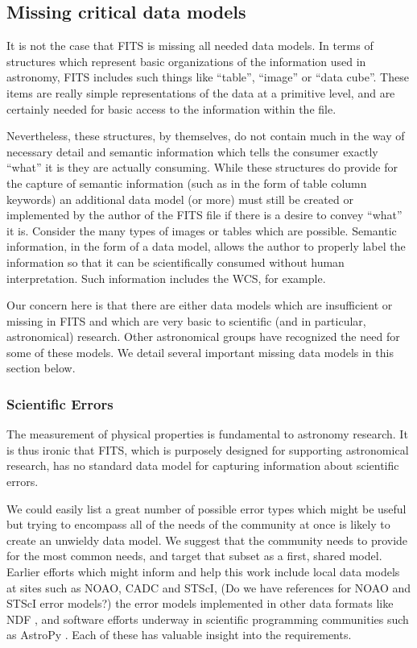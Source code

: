 \documentclass[final,authoryear,5p,times,twocolumn]{elsarticle}
\begin{document}
{{\subsection{Missing critical data models}
\label{section_crit_data_models}


It is not the case that FITS is missing all needed data models. In
terms of structures which represent basic organizations of the
information used in astronomy, FITS includes such things like ``table'',
``image'' or ``data cube''. These items are really simple representations
of the data at a primitive level, and are certainly needed for basic
access to the information within the file.


Nevertheless, these structures, by themselves, do not contain much in
the way of necessary detail and semantic information which tells the
consumer exactly ``what'' it is they are actually consuming. While these
structures do provide for the capture of semantic information (such as
in the form of table column keywords) an additional data model (or
more) must still be created or implemented by the author of the FITS
file if there is a desire to convey ``what'' it is. Consider the many
types of images or tables which are possible. Semantic information, in
the form of a data model, allows the author to properly label the
information so that it can be scientifically consumed without human
interpretation. Such information includes the WCS, for example.


Our concern here is that there are either data models which are
insufficient or missing in FITS and which are very basic to scientific
(and in particular, astronomical) research. Other astronomical groups
have recognized the need for some of these models. We detail
several important missing data models in this section below.

\subsubsection{Scientific Errors}


The measurement of physical properties is fundamental to astronomy
research. It is thus ironic that FITS, which is purposely designed for
supporting astronomical research, has no standard data model for
capturing information about scientific errors.


We could easily list a great number of possible error types which
might be useful but trying to encompass all of the needs of the
community at once is likely to create an unwieldy data model. We
suggest that the community needs to provide for the most common needs,
and target that subset as a first, shared model. Earlier efforts which
might inform and help this work include local data models at sites
such as NOAO, CADC \citep{2012ASPC..461..339D} and STScI,
{\color{red} (Do we have references for NOAO and STScI error models?)}
the error
models implemented in other data formats like NDF
\citep[although see for example][]{1991StarB...8...19M}, and software
efforts underway in scientific programming communities such as AstroPy
\citep{2013A&A...558A..33A}. Each of these has valuable insight into
the requirements.


}}
\end{document}
